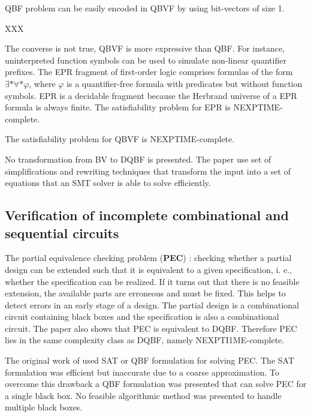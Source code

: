 \documentclass[runningheads]{llncs}
\begin{document}
QBF problem can be easily encoded in QBVF
by using bit-vectors of size 1.

\begin{example}
  XXX
\end{example}

The converse is not true, QBVF is more expressive than QBF.
For instance, uninterpreted function symbols can be used to simulate non-linear quantifier prefixes.
The EPR fragment of first-order logic comprises formulas of the form $\exists * \forall * \varphi$, where $\varphi$ is a quantifier-free formula with predicates but without function symbols.
EPR is a decidable fragment because the Herbrand universe of a
EPR formula is always finite. The satisfiability problem for
EPR is NEXPTIME-complete.

\begin{theorem}
  The satisfiability problem for QBVF is
  NEXPTIME-complete.
\end{theorem}

No transformation from BV to DQBF is presented. The paper use set of simplifications and rewriting techniques that transform the input into a set of equations that an SMT solver is able to solve efficiently.

\subsection{Verification of incomplete combinational and sequential circuits}\label{subsec:pec}

The partial equivalence checking problem (\textbf{PEC}) \cite{gitinarswb13r}: checking whether a partial design can be extended
such that it is equivalent to a given specification, i. e., whether the specification can be realized.
If it turns out that there is no feasible extension, the available parts are erroneous and must be fixed. This helps to detect errors in an early stage of a design.
The partial design is a combinational circuit containing
black boxes and the specification is also a combinational circuit.
The paper also shows that PEC is equivalent to DQBF. Therefore PEC lies in the same complexity class as DQBF, namely NEXPTI1ME-complete.

The original work of \cite{schollb01} used SAT or QBF formulation for solving PEC. The SAT formulation was
efficient but inaccurate due to a coarse
approximation.
To overcome this drawback a QBF formulation was presented that can solve PEC for a single black box.
No feasible algorithmic method was presented to handle multiple black boxes.
\end{document}
